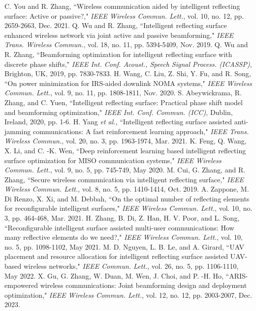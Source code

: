 \documentclass{IEEEoj}
\begin{document}
\begin{thebibliography}{00}
	 C. You and R. Zhang, “Wireless communication aided by intelligent reflecting surface: Active or passive?," \textit{IEEE Wireless Commun. Lett.}, vol. 10, no. 12, pp. 2659-2663, Dec. 2021.
	 Q. Wu and R. Zhang, “Intelligent reflecting surface enhanced wireless network via joint active and passive beamforming," \textit{IEEE Trans. Wireless Commun.}, vol. 18, no. 11, pp. 5394-5409, Nov. 2019.
	 Q. Wu and R. Zhang, “Beamforming optimization for intelligent reflecting surface with discrete phase shifts," \textit{IEEE Int. Conf. Acoust., Speech Signal Process. (ICASSP)}, Brighton, UK, 2019, pp. 7830-7833.
	 H. Wang, C. Liu, Z. Shi, Y. Fu, and R. Song, “On power minimization for IRS-aided downlink NOMA systems," \textit{IEEE Wireless Commun. Lett.}, vol. 9, no. 11, pp. 1808-1811, Nov. 2020.
	 S. Abeywickrama, R. Zhang, and C. Yuen, “Intelligent reflecting surface: Practical phase shift model and beamforming optimization," \textit{IEEE Int. Conf. Commun. (ICC)}, Dublin, Ireland, 2020, pp. 1-6.
	 H. Yang \textit{et al.}, “Intelligent reflecting surface assisted anti-jamming communications: A fast reinforcement learning approach," \textit{IEEE Trans. Wireless Commun.}, vol. 20, no. 3, pp. 1963-1974, Mar. 2021.
	 K. Feng, Q. Wang, X. Li, and C. -K. Wen, “Deep reinforcement learning based intelligent reflecting surface optimization for MISO communication systems," \textit{IEEE Wireless Commun. Lett.}, vol. 9, no. 5, pp. 745-749, May 2020.
	 M. Cui, G. Zhang, and R. Zhang, “Secure wireless communication via intelligent reflecting surface," \textit{IEEE Wireless Commun. Lett.}, vol. 8, no. 5, pp. 1410-1414, Oct. 2019.
	 A. Zappone, M. Di Renzo, X. Xi, and M. Debbah, “On the optimal number of reflecting elements for reconfigurable intelligent surfaces," \textit{IEEE Wireless Commun. Lett.}, vol. 10, no. 3, pp. 464-468, Mar. 2021.
	 H. Zhang, B. Di, Z. Han, H. V. Poor, and L. Song, “Reconfigurable intelligent surface assisted multi-user communications: How many reflective elements do we need?," \textit{IEEE Wireless Commun. Lett.}, vol. 10, no. 5, pp. 1098-1102, May 2021.
	 M. D. Nguyen, L. B. Le, and A. Girard, “UAV placement and resource allocation for intelligent reflecting surface assisted UAV-based wireless networks," \textit{IEEE Commun. Lett.}, vol. 26, no. 5, pp. 1106-1110, May 2022.
	 X. Gu, G. Zhang, W. Duan, M. Wen, J. Choi, and P. -H. Ho, “ARIS-empowered wireless communications: Joint beamforming design and deployment optimization," \textit{IEEE Wireless Commun. Lett.}, vol. 12, no. 12, pp. 2003-2007, Dec. 2023.

\end{thebibliography}
\end{document}
